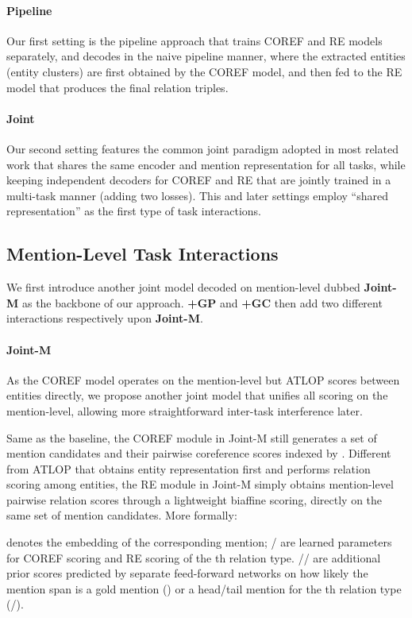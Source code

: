 \documentclass[11pt]{article}
\begin{document}
\paragraph{Pipeline}
Our first setting is the pipeline approach that trains COREF and RE models separately, and decodes in the naive pipeline manner, where the extracted entities (entity clusters) are first obtained by the COREF model, and then fed to the RE model that produces the final relation triples.

\paragraph{Joint}
Our second setting features the common joint paradigm adopted in most related work \cite{dygie,dwie,joint-mil} that shares the same encoder and mention representation for all tasks, while keeping independent decoders for COREF and RE that are jointly trained in a multi-task manner (adding two losses). This and later settings employ ``shared representation'' as the first type of task interactions.


\subsection{Mention-Level Task Interactions}
\label{subsec:interactions}

We first introduce another joint model decoded on mention-level dubbed \textbf{Joint-M} as the backbone of our approach. \textbf{+GP} and \textbf{+GC} then add two different interactions respectively upon \textbf{Joint-M}.

\paragraph{Joint-M}
As the COREF model operates on the mention-level but ATLOP scores between entities directly, we propose another joint model that unifies all scoring on the mention-level, allowing more straightforward inter-task interference later.

Same as the baseline, the COREF module in Joint-M still generates a set of mention candidates  and their pairwise coreference scores  indexed by . Different from ATLOP that obtains entity representation first and performs relation scoring among entities, the RE module in Joint-M simply obtains mention-level pairwise relation scores  through a lightweight biaffine scoring, directly on the same set of mention candidates. More formally:

 denotes the embedding of the corresponding mention;
/ are learned parameters for COREF scoring and RE scoring of the th relation type. // are additional prior scores predicted by separate feed-forward networks on how likely the mention span is a gold mention () or a head/tail mention for the th relation type (/).
\end{document}
